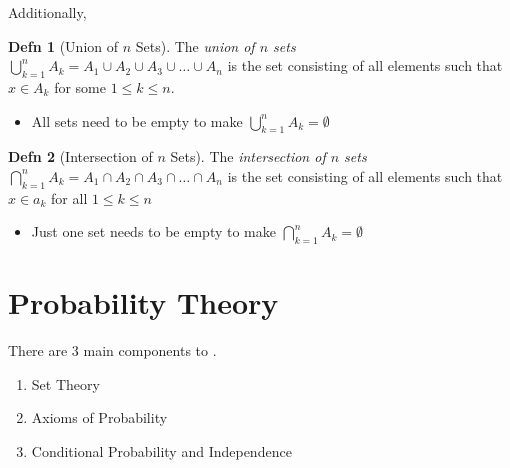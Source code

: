 \documentclass[10pt,letterpaper,final,twoside,notitlepage]{article}
\theoremstyle{plain}
\theoremstyle{definition}
\newtheorem{definition}{Defn}
\begin{document}
	Additionally, 
	\begin{definition}[Union of $n$ Sets] \label{def:Union of n Sets}
		The \emph{union of $n$ sets} $\bigcup_{k=1}^{n} A_{k} = A_{1} \cup A_{2} \cup A_{3} \cup \ldots \cup A_{n}$ is the set consisting of all elements such that $x \in A_{k}$ for some $1 \leq k \leq n$.
		\begin{itemize}[noitemsep, nolistsep]
			\item All sets need to be empty to make $\bigcup_{k=1}^{n} A_{k} = \emptyset$
		\end{itemize}
	\end{definition}
	\begin{definition}[Intersection of $n$ Sets] \label{def:Intersection of n Sets}
		The \emph{intersection of $n$ sets} $\bigcap_{k=1}^{n} A_{k} = A_{1} \cap A_{2} \cap A_{3} \cap \ldots \cap A_{n}$ is the set consisting of all elements such that $x \in a_{k}$ for all $1 \leq k \leq n$
		\begin{itemize}[noitemsep, nolistsep]
			\item Just one set needs to be empty to make $\bigcap_{k=1}^{n} A_{k} = \emptyset$
		\end{itemize}
	\end{definition}
	
\section{Probability Theory} \label{sec:Probability Theory}
There are 3 main components to .
\begin{enumerate}
	\item Set Theory
	\item Axioms of Probability
	\item Conditional Probability and Independence
\end{enumerate}
\end{document}

